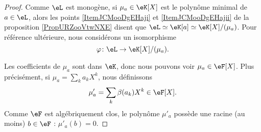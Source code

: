 \begin{proof}
	Comme \( \eL\) est monogène, si \( \mu_a\in \eK[X]\) est le polynôme minimal de \( a\in \eL\), alors les points \ref{ItemJCMooDgEHaji} et \ref{ItemJCMooDgEHajii} de la proposition \ref{PropURZooVtwNXE} disent que \( \eL\simeq \eK[a]\simeq \eK[X]/(\mu_a)\). Pour référence ultérieure, nous considérons un isomorphisme
	\begin{equation}
		\varphi\colon \eL\to \eK[X]/(\mu_a).
	\end{equation}

	Les coefficients de \( \mu_a\) sont dans \( \eK\), donc nous pouvons voir \( \mu_a\in \eF[X]\). Plus précisément, si \( \mu_a=\sum_ka_kX^k\), nous définissons
	\begin{equation}
		\mu'_a=\sum_k\beta(a_k)X^k\in \eF[X].
	\end{equation}
	Comme \( \eF\) est algébriquement clos, le polynôme \( \mu'_a\) possède une racine (au moins) \( b\in \eF\) : \( \mu'_a(b)=0\).


\end{proof}
